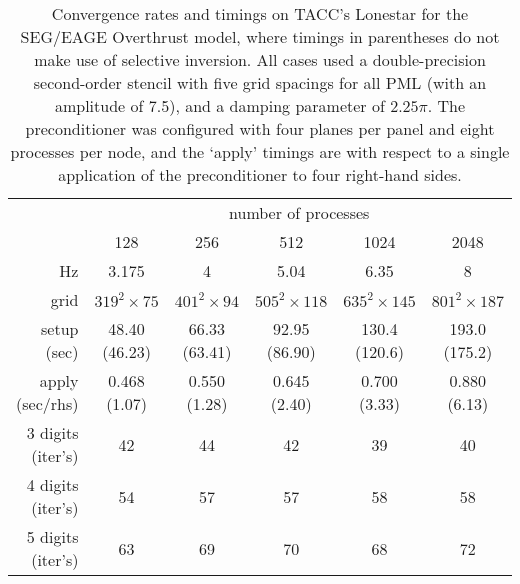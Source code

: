 \begin{table}
\footnotesize
\centering
\begin{tabular}{r|c|c|c|c|c|}
\cline{2-6}
 & \multicolumn{5}{|c|}{number of processes} \\
\cline{2-6}
 & 128 & 256 & 512 & 1024 & 2048  \\
\hline
\multicolumn{1}{|r|}{Hz}
 & 3.175
 & 4
 & 5.04
 & 6.35
 & 8 \\
\hline
\multicolumn{1}{|r|}{grid}
 & $319^2 \!\times\! 75$
 & $401^2 \!\times\! 94$
 & $505^2 \!\times\! 118$
 & $635^2 \!\times\! 145$
 & $801^2 \!\times\! 187$ \\
\hline
\multicolumn{1}{|r|}{setup (sec)}
 & 48.40 (46.23)
 & 66.33 (63.41) 
 & 92.95 (86.90)
 & 130.4 (120.6)
 & 193.0 (175.2) \\
\hline
\multicolumn{1}{|r|}{apply (sec/rhs)}
 & 0.468 (1.07)
 & 0.550 (1.28) 
 & 0.645 (2.40)
 & 0.700 (3.33)
 & 0.880 (6.13) \\
\hline
\multicolumn{1}{|r|}{3 digits (iter's)}
 & 42
 & 44
 & 42
 & 39
 & 40 \\
\hline
\multicolumn{1}{|r|}{4 digits (iter's)}
 & 54
 & 57
 & 57
 & 58
 & 58 \\
\hline
\multicolumn{1}{|r|}{5 digits (iter's)}
 & 63
 & 69
 & 70
 & 68
 & 72 \\
\hline
\end{tabular}
\caption{Convergence rates and timings on TACC's Lonestar for the 
SEG/EAGE Overthrust model, where timings in parentheses do not make use of 
selective inversion. All cases used a double-precision second-order 
stencil with five grid spacings for all PML (with an amplitude
of 7.5), and a damping parameter of $2.25 \pi$.
The preconditioner was configured with four planes per panel and eight 
processes per node, and the `apply' timings are with respect to a single 
application of the preconditioner to four right-hand sides.}
\label{tbl:overthrust-test}
\end{table}
